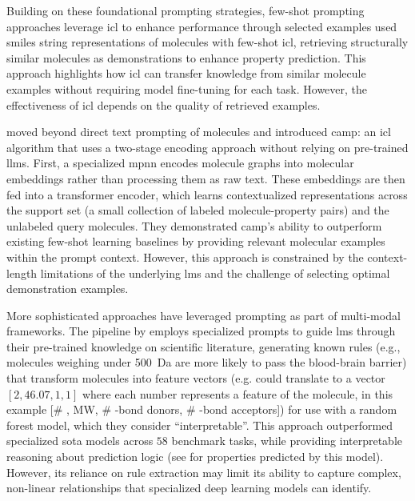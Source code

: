 Building on these foundational prompting strategies, few-shot prompting approaches leverage \gls{icl} to enhance performance through selected examples \textcite{liu2024moleculargpt} used \gls{smiles} string representations of molecules with few-shot \gls{icl}, retrieving structurally similar molecules as demonstrations to enhance property prediction. 
This approach highlights how \gls{icl} can transfer knowledge from similar molecule examples without requiring model fine-tuning for each task. 
However, the effectiveness of \gls{icl} depends on the quality of retrieved examples.

\textcite{fifty2023incontext} moved beyond direct text prompting of molecules and introduced \gls{camp}: an \gls{icl} algorithm that uses a two-stage encoding approach without relying on pre-trained \glspl{llm}.
First, a specialized \gls{mpnn} encodes molecule graphs into molecular embeddings rather than processing them as raw text. 
These embeddings are then fed into a transformer encoder, which learns contextualized representations across the support set (a small collection of labeled molecule-property pairs) and the unlabeled query molecules. They demonstrated \gls{camp}'s ability to outperform existing few-shot learning baselines by providing relevant molecular examples within the prompt context. However, this approach is constrained by the context-length limitations of the underlying \glspl{lm} and the challenge of selecting optimal demonstration examples.

More sophisticated approaches have leveraged prompting as part of multi-modal frameworks. The  pipeline by \textcite{zheng2025large} employs specialized prompts to guide \glspl{lm} through their pre-trained knowledge on scientific literature, generating known rules (e.g., molecules weighing under \SI{500}{Da} are more likely to pass the blood-brain barrier) that transform molecules into feature vectors (e.g.  could translate to a vector $[2,46.07,1,1]$ where each number represents a feature of the molecule, in this example [\# , MW, \# -bond donors, \# -bond acceptors]) for use with a random forest model, which they consider \enquote{interpretable}. 
This approach outperformed specialized \gls{sota} models across $58$ benchmark tasks, while providing interpretable reasoning about prediction logic (see  for properties predicted by this model). However, its reliance on rule extraction may limit its ability to capture complex, non-linear relationships that specialized deep learning models can identify.

